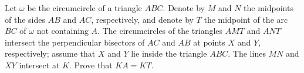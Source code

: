Let 
$\omega$
 be the circumcircle of a triangle 
$ABC$.
 Denote by 
$M$
 and 
$N$
 the midpoints of the sides 
$AB$
 and 
$AC$, 
 respectively, and denote by 
$T$
 the midpoint of the arc 
$BC$
 of 
$\omega$
 not containing 
$A$.
 The circumcircles of the triangles 
$AMT$
 and 
$ANT$
 intersect the perpendicular bisectors of 
$AC$
 and 
$AB$
 at points 
$X$
 and 
$Y$, 
 respectively; assume that 
$X$
 and 
$Y$
 lie inside the triangle 
$ABC$.
 The lines 
$MN$
 and 
$XY$
 intersect at 
$K$.
 Prove that 
$KA=KT$.
